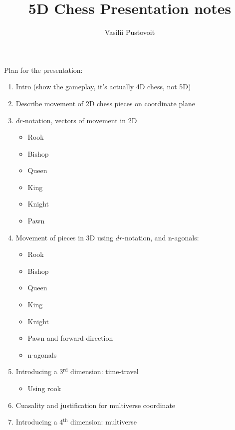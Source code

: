 


\author{Vasilii Pustovoit}
\title{5D Chess Presentation notes}

\maketitle

Plan for the presentation:

\begin{enumerate}
	\item Intro (show the gameplay, it's actually 4D chess, not 5D)
	\item Describe movement of 2D chess pieces on coordinate plane
	\item $dr$-notation, vectors of movement in 2D
	    \begin{itemize}
	        \item Rook
	        \item Bishop
	        \item Queen
	        \item King
	        \item Knight
			\item Pawn
	    \end{itemize}
	\item Movement of pieces in 3D using $dr$-notation, and n-agonals:
	    \begin{itemize}
	        \item Rook
	        \item Bishop
	        \item Queen
	        \item King
	        \item Knight
			\item Pawn and forward direction
			\item n-agonals
	    \end{itemize}
	\item Introducing a 3$^{\text{rd}}$ dimension: time-travel
		\begin{itemize}
			\item Using rook
		\end{itemize}
	\item Cuasality and justification for multiverse coordinate
	\item Introducing a 4$^{\text{th}}$ dimension: multiverse
		\begin{itemize}

\end{itemize}
\end{enumerate}
